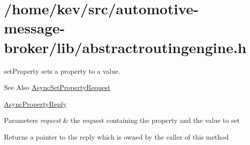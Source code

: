 \hypertarget{_2home_2kev_2src_2automotive-message-broker_2lib_2abstractroutingengine_8h-example}{\section{/home/kev/src/automotive-\/message-\/broker/lib/abstractroutingengine.\-h}
}
set\-Property sets a property to a value. \begin{DoxySeeAlso}{See Also}
\hyperlink{classAsyncSetPropertyRequest}{Async\-Set\-Property\-Request} 

\hyperlink{classAsyncPropertyReply}{Async\-Property\-Reply} 
\end{DoxySeeAlso}

\begin{DoxyParams}{Parameters}
{\em request} & the request containing the property and the value to set \\
\hline
\end{DoxyParams}
\begin{DoxyReturn}{Returns}
a pointer to the reply which is owned by the caller of this method
\end{DoxyReturn}

\begin{DoxyCodeInclude}
\end{DoxyCodeInclude}
 